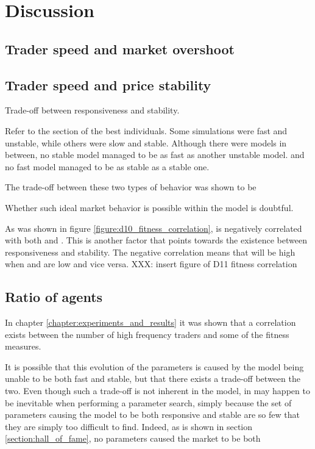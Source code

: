 \chapter{Discussion}\label{chapter:discussion}

\section{Trader speed and market overshoot}

\section{Trader speed and price stability}
Trade-off between responsiveness and stability.

Refer to the section of the best individuals. 
Some simulations were fast and unstable, while others were slow and stable. Although there were models in between, no stable model managed to be as fast as another unstable model. and no fast model managed to be as stable as a stable one. 

The trade-off between these two types of behavior was shown to be 

Whether such ideal market behavior is possible within the model is doubtful. 



As was shown in figure \ref{figure:d10_fitness_correlation}, \timetoreachnewfundamental{} is negatively correlated with both \stdev{} and \overshoot{}. This is another factor that points towards the existence between responsiveness and stability. The negative correlation means that \timetoreachnewfundamental will be high when \stdev and \overshoot are low and vice versa. 
XXX: insert figure of D11 fitness correlation

\section{Ratio of agents}
In chapter \ref{chapter:experiments_and_results} it was shown that a correlation exists between the number of high frequency traders and some of the fitness measures. 

It is possible that this evolution of the parameters is caused by the model being unable to be both fast and stable, but that there exists a trade-off between the two. Even though such a trade-off is not inherent in the model, in may happen to be inevitable when performing a parameter search, simply because the set of parameters causing the model to be both responsive and stable are so few that they are simply too difficult to find. Indeed, as is shown in section \ref{section:hall_of_fame}, no parameters caused the market to be both 



